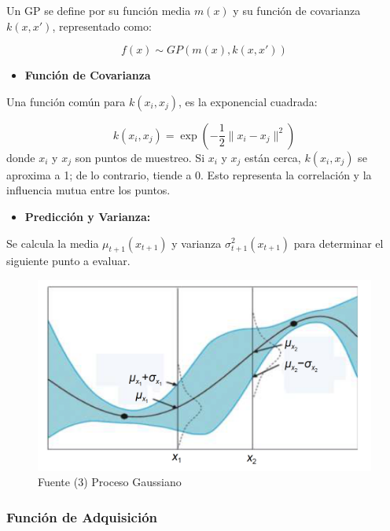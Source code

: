 \documentclass[
  12pt,
  letterpaper,
  DIV=11,
  numbers=noendperiod]{scrartcl}
\providecommand{\tightlist}{%
  \setlength{\itemsep}{0pt}\setlength{\parskip}{0pt}}\usepackage{longtable,booktabs,array}
\begin{document}
Un GP se define por su función media \(m(x)\) y su función de covarianza
\(k(x, x')\), representado como:

\[
f(x) \sim GP(m(x), k(x, x'))
\]

\begin{itemize}
\tightlist
\item
  \textbf{Función de Covarianza}
\end{itemize}

Una función común para \(k(x_i, x_j)\), es la exponencial cuadrada:

\[
k(x_i, x_j) = \exp\left(-\frac{1}{2} \|x_i - x_j\|^2\right)
\] donde \(x_i\) y \(x_j\) son puntos de muestreo. Si \(x_i\) y \(x_j\)
están cerca, \(k(x_i, x_j)\) se aproxima a 1; de lo contrario, tiende a
0. Esto representa la correlación y la influencia mutua entre los
puntos.

\begin{itemize}
\tightlist
\item
  \textbf{Predicción y Varianza:}
\end{itemize}

Se calcula la media \(\mu_{t+1}(x_{t+1})\) y varianza
\(\sigma^2_{t+1}(x_{t+1})\) para determinar el siguiente punto a
evaluar.

\begin{figure}[H]

{\centering \includegraphics{imgs/Proceso_Gaussiano_1Dim.png}

}

\caption{Fuente (3) Proceso Gaussiano}

\end{figure}%

\subsubsection{Función de
Adquisición}\label{funciuxf3n-de-adquisiciuxf3n}
\end{document}

